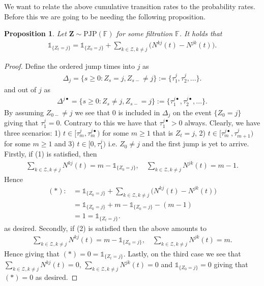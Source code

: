 \documentclass[12pt,letter,twoside]{article}
\theoremstyle{plain}
\newtheorem{proposition}[theorem]{Proposition}
\theoremstyle{definition}
\theoremstyle{remark}
\begin{document}
We want to relate the above cumulative transition rates to the probability rates. Before this we are going to be needing the following proposition.
\begin{proposition}\label{prop:1}
Let $\mathbf Z\sim \text{PJP}(\mathbb F)$ for some filtration $\mathbb F$. It holds that
\begin{align}
\mathds 1_{\{Z_t=j\}}=\mathds 1_{\{Z_0=j\}}+\sum_{k\in\mathcal Z, k\ne j}\Big(N^{kj}(t)-N^{jk}(t)\Big).
\end{align}
\end{proposition}
\begin{proof}
Define the ordered jump times into $j$ as
\begin{align}
\Delta_j=\{ s\ge 0 : Z_s=j, Z_{s-}\ne j\}:=\{\tau^j_1,\tau^j_2,...\}.
\end{align}
and out of $j$ as
\begin{align}
\Delta^{j\bullet}=\{s\ge 0 : Z_s \ne j, Z_{s-}=j\}:=\{\tau^{j\bullet}_1,\tau^{j\bullet}_2,...\}.
\end{align}
By assuming $Z_{0-}\ne j$ we see that $0$ is included in $\Delta_j$ on the event $\{Z_0=j\}$ giving that $\tau^j_1=0$. Contrary to this we have that $\tau^{j\bullet}_1>0$ always. Clearly, we have three scenarios: 1) $t\in [\tau^j_m,\tau^{j\bullet}_m)$ for some $m\ge1$ that is $Z_t=j$, 2) $t\in [\tau^{j\bullet}_m,\tau^j_{m+1})$ for some $m\ge 1$ and 3) $t\in [0,\tau^j_1)$ i.e. $Z_0\ne j$ and the first jump is yet to arrive.
Firstly, if (1) is satisfied, then 
\begin{align}
\sum_{k\in\mathcal Z,k\ne j}N^{kj}(t)=m-\mathds 1_{\{Z_0=j\}},\quad \sum_{k\in\mathcal Z,k\ne j}N^{jk}(t)=m-1.
\end{align}
Hence
\begin{align}
(*):&=\mathds 1_{\{Z_0=j\}}+\sum_{k\in\mathcal Z, k\ne j}\Big(N^{kj}(t)-N^{jk}(t)\Big)\\
&= \mathds 1_{\{Z_0=j\}} +m-\mathds 1_{\{Z_0=j\}}-(m-1)\\
&=1=\mathds 1_{\{Z_t=j\}}.
\end{align}
as desired. Secondly, if (2) is satisfied then the above amounts to
\begin{align}
\sum_{k\in\mathcal Z,k\ne j}N^{kj}(t)=m-\mathds 1_{\{Z_0=j\}},\quad \sum_{k\in\mathcal Z,k\ne j}N^{jk}(t)=m.
\end{align}
Hence giving that $(*)=0=\mathds 1_{\{Z_t=j\}}$. Lastly, on the third case we see that $\sum_{k\in\mathcal Z,k\ne j}N^{kj}(t)=0$, $\sum_{k\in\mathcal Z,k\ne j}N^{jk}(t)=0$ and $\mathds 1_{\{Z_0=j\}}=0$ giving that $(*)=0$ as desired.
\end{proof}
\end{document}
